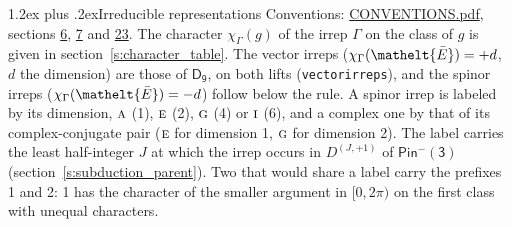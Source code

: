 \documentclass[10pt,a4paper]{article}
\makeatletter
\renewcommand\section{\@startsection{section}{1}{\z@}{-3ex plus -1ex minus -.2ex}%
  {1.2ex plus .2ex}{\normalfont\large\sffamily\bfseries\color{parttitle}}}
\numberwithin{equation}{section}
\newcommand{\eltfont}[1]{{\let\sigma\eltsigma\mathelt{#1}}}
\newcommand{\grp}[1]{\mathsf{#1}}
\newcommand{\irr}[1]{\text{\normalfont\scshape #1}}
\newcommand{\elt}[1]{\eltfont{#1}}
\newcommand{\irrJp}[2]{D^{(#1,#2)}}
\newcommand{\irchar}[1]{\chi_{#1}}
\newcommand{\barred}[1]{\bar{#1}}
\makeatother
\begin{document}
\section{Irreducible representations}\label{s:irreps}
Conventions: \href{../../CONVENTIONS.pdf}{CONVENTIONS.pdf}, sections \href{../../../rotation/CONVENTIONS.pdf\#conv.6}{6}, \href{../../../rotation/CONVENTIONS.pdf\#conv.7}{7} and \href{../../CONVENTIONS.pdf\#conv.23}{23}.
\leavevmode\label{n:function.character}\label{n:irrep.Gamma}The character $\irchar{\Gamma}(g)$ of the irrep $\Gamma$ on the class of $g$ is given in section~\ref{s:character_table}. \label{n:index.dimension}The vector irreps ($\irchar{\Gamma}(\elt{\barred{E}}) = +d$, $d$ the dimension) are those of \href{../../../rotation/data/pdf/D9.pdf}{$\grp{D_{9}}$}, on both lifts (\texttt{vectorirreps}), and the spinor irreps ($\irchar{\Gamma}(\elt{\barred{E}}) = -d$) follow below the rule. A spinor irrep is labeled by its dimension, $\irr{a}$ (1), $\irr{e}$ (2), $\irr{g}$ (4) or $\irr{i}$ (6), and a complex one by that of its complex-conjugate pair ($\irr{e}$ for dimension 1, $\irr{g}$ for dimension 2). The label carries the least half-integer $J$ at which the irrep occurs in $\irrJp{J}{+1}$ of $\grp{Pin^{-}(3)}$ (section~\ref{s:subduction_parent}). Two that would share a label carry the prefixes 1 and 2: 1 has the character of the smaller argument in $[0, 2\pi)$ on the first class with unequal characters.
\end{document}
